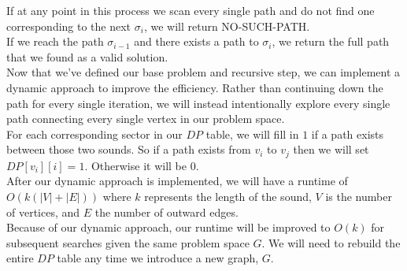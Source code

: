 \documentclass{article}
\begin{document}
\begin{enumerate}
If at any point in this process we scan every single path and do not find one corresponding to the next $\sigma_i$, we will return NO-SUCH-PATH. \\
If we reach the path $\sigma_{i-1}$ and there exists a path to $\sigma_i$, we return the full path that we found as a valid solution. \\
\newline 
Now that we've defined our base problem and recursive step, we can implement a dynamic approach to improve the efficiency. Rather than continuing down the path for every single iteration, we will instead intentionally explore every single path connecting every single vertex in our problem space. \\
For each corresponding sector in our $DP$ table, we will fill in $1$ if a path exists between those two sounds. So if a path exists from $v_i$ to $v_j$ then we will set $DP[v_i][i] = 1$. Otherwise it will be 0. \\
\newline 
After our dynamic approach is implemented, we will have a runtime of $O(k(|V| + |E|))$ where $k$ represents the length of the sound, $V$ is the number of vertices, and $E$ the number of outward edges. \\
Because of our dynamic approach, our runtime will be improved to $O(k)$ for subsequent searches given the same problem space $G$. We will need to rebuild the entire $DP$ table any time we introduce a new graph, $G$.











\end{enumerate}
\end{document}
